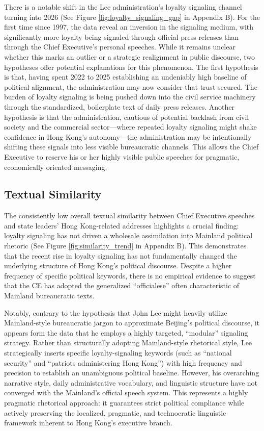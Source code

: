 \documentclass[9pt,a4paper,twocolumn,twoside]{rho-class/rho}
\begin{document}
        There is a notable shift in the Lee administration's loyalty signaling channel turning into 2026 (See Figure \ref{fig:loyalty_signaling_gap} in Appendix B). For the first time since 1997, the data reveal an inversion in the signaling medium, with significantly more loyalty 
        being signaled through official press releases than through the Chief Executive's personal speeches. While it remains unclear whether this marks an outlier or a strategic realignment in public discourse, 
        two hypotheses offer potential explanations for this phenomenon. The first hypothesis is that, having spent 2022 to 2025 establishing an undeniably high baseline of political alignment, the administration 
        may now consider that trust secured. The burden of loyalty signaling is being pushed down into the civil service machinery through the standardized, boilerplate text of daily press releases. Another 
        hypothesis is that the administration, cautious of potential backlash from civil society and the commercial sector—where repeated loyalty signaling might shake confidence in Hong Kong's autonomy—the 
        administration may be intentionally shifting these signals into less visible bureaucratic channels. This allows the Chief Executive to reserve his or her highly visible public speeches for pragmatic, economically oriented messaging.
    
    \subsection{Textual Similarity}

        The consistently low overall textual similarity between Chief Executive speeches and state leaders' Hong Kong-related addresses highlights a crucial finding: loyalty signaling has not driven a wholesale assimilation into Mainland political rhetoric (See Figure \ref{fig:similarity_trend} in Appendix B). This demonstrates that the recent rise in loyalty signaling has not fundamentally changed the underlying structure of Hong Kong's political discourse. Despite a higher frequency of specific political keywords, there is no empirical evidence to suggest that the CE has adopted the generalized ``officialese'' often characteristic of Mainland bureaucratic texts.
        
        Notably, contrary to the hypothesis that John Lee might heavily utilize Mainland-style bureaucratic jargon to approximate Beijing's political discourse, it appears form the data that he employs a highly targeted, ``modular'' signaling strategy. Rather than structurally adopting Mainland-style rhetorical style, Lee strategically inserts specific loyalty-signaling keywords (such as ``national security'' and ``patriots administering Hong Kong'') with high frequency and precision to establish an unambiguous political baseline. However, his overarching narrative style, daily administrative vocabulary, and linguistic structure have not converged with the Mainland's official speech system. This represents a highly pragmatic rhetorical approach: it guarantees strict political compliance while actively preserving the localized, pragmatic, and technocratic linguistic framework inherent to Hong Kong's executive branch.
\end{document}
